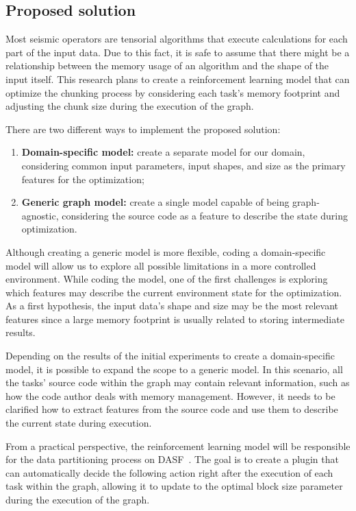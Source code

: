 \subsection{Proposed solution}
\label{subsec:proposed-solution}

Most seismic operators are tensorial algorithms that execute calculations for each part of the input data.
Due to this fact, it is safe to assume that there might be a relationship between the memory usage of an algorithm and the shape of the input itself.
This research plans to create a reinforcement learning model that can optimize the chunking process by considering each task's memory footprint and adjusting the chunk size during the execution of the graph.

There are two different ways to implement the proposed solution:

\begin{enumerate}
  \item \textbf{Domain-specific model:} create a separate model for our domain, considering common input parameters, input shapes, and size as the primary features for the optimization;
  \item \textbf{Generic graph model:} create a single model capable of being graph-agnostic, considering the source code as a feature to describe the state during optimization.
\end{enumerate}

Although creating a generic model is more flexible, coding a domain-specific model will allow us to explore all possible limitations in a more controlled environment.
While coding the model, one of the first challenges is exploring which features may describe the current environment state for the optimization.
As a first hypothesis, the input data's shape and size may be the most relevant features since a large memory footprint is usually related to storing intermediate results.

Depending on the results of the initial experiments to create a domain-specific model, it is possible to expand the scope to a generic model.
In this scenario, all the tasks' source code within the graph may contain relevant information, such as how the code author deals with memory management.
However, it needs to be clarified how to extract features from the source code and use them to describe the current state during execution.

From a practical perspective, the reinforcement learning model will be responsible for the data partitioning process on \ac{DASF}~\cite{dasf}.
The goal is to create a plugin that can automatically decide the following action right after the execution of each task within the graph, allowing it to update to the optimal block size parameter during the execution of the graph.
